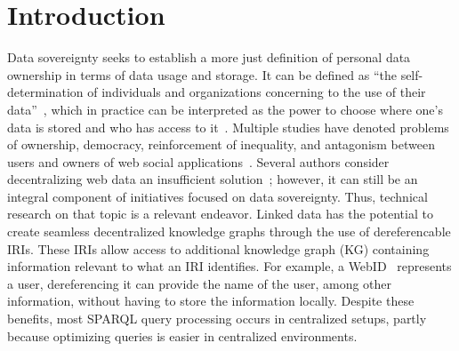 \section{Introduction}

Data sovereignty seeks to establish a more just definition of personal data ownership in terms of data usage and storage.
It can be defined as ``the self-determination of individuals and organizations concerning to the use of their data''~\cite{verstraete2022solid},
which in practice can be interpreted as the power to choose where one's data is stored and who has access to it~\cite{verstraete2022solid}.
Multiple studies have denoted problems of ownership, democracy, reinforcement of inequality, and antagonism between users and owners of web social applications~\cite{Terranova2000FreeLP, Curran2016ch1, Sevignani2013, 9663788}.
Several authors consider decentralizing web data an insufficient solution~\cite{9663788, Curran2016ch1}; however, it can still be an integral component of initiatives focused on data sovereignty.
Thus, technical research on that topic is a relevant endeavor.
Linked data has the potential to create seamless decentralized knowledge graphs through the use of dereferencable IRIs.
These IRIs allow access to additional knowledge graph (KG) containing information relevant to what an IRI identifies.
For example, a WebID~ represents a user, dereferencing it can provide the name of the user, among other information, without having to store the information locally.
Despite these benefits, most SPARQL query processing occurs in centralized setups, partly because optimizing queries is easier in centralized environments.

